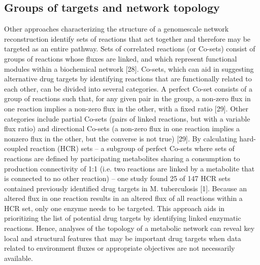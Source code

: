 \subsection{Groups of targets and network topology}
Other approaches characterizing the structure of a genomescale 
network reconstruction identify sets of reactions that act 
together and therefore may be targeted as an entire pathway. 
Sets of correlated reactions (or Co-sets) consist of groups 
of reactions whose fluxes are linked, and which represent 
functional modules within a biochemical network [28]. Co-sets, 
which can aid in suggesting alternative drug targets by 
identifying reactions that are functionally related to each 
other, can be divided into several categories. A perfect 
Co-set consists of a group of reactions such that, for any 
given pair in the group, a non-zero flux in one reaction 
implies a non-zero flux in the other, with a fixed ratio [29]. 
Other categories include partial Co-sets (pairs of linked 
reactions, but with a variable flux ratio) and directional 
Co-sets (a non-zero flux in one reaction implies a nonzero 
flux in the other, but the converse is not true) [29]. By 
calculating hard-coupled reaction (HCR) sets – a subgroup 
of perfect Co-sets where sets of reactions are defined by 
participating metabolites sharing a consumption to production 
connectivity of 1:1 (i.e. two reactions are linked by a 
metabolite that is connected to no other reaction) – one study 
found 25 of 147 HCR sets contained previously identified drug targets 
in M. tuberculosis [1]. Because an altered flux in one reaction 
results in an altered flux of all reactions within a HCR set, only 
one enzyme needs to be targeted. This approach aids in prioritizing 
the list of potential drug targets by identifying linked enzymatic 
reactions. Hence, analyses of the topology of a metabolic network 
can reveal key local and structural features that may be important 
drug targets when data related to environment fluxes or appropriate 
objectives are not necessarily available.

